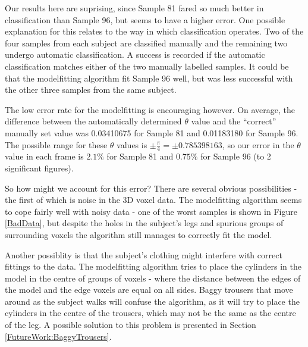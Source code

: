 Our results here are suprising, since Sample 81 fared so much better in classification than Sample 96, but seems to have a higher error.
One possible explanation for this relates to the way in which classification operates.
Two of the four samples from each subject are classified manually and the remaining two undergo automatic classification.
A success is recorded if the automatic classification matches either of the two manually labelled samples.
It could be that the modelfitting algorithm fit Sample 96 well, but was less successful with the other three samples from the same subject.

The low error rate for the modelfitting is encouraging however.
On average, the difference between the automatically determined $\theta$ value and the ``correct'' manually set value was 0.03410675 for Sample 81 and 0.01183180 for Sample 96.
The possible range for these $\theta$ values is $\pm \frac{\pi}{4} = \pm 0.785398163$, so our error in the $\theta$ value in each frame is $2.1\%$ for Sample 81 and $0.75\%$ for Sample 96 (to 2 significant figures).

\bigskip
\noindent So how might we account for this error?
There are several obvious possibilities - the first of which is noise in the 3D voxel data.
The modelfitting algorithm seems to cope fairly well with noisy data - one of the worst samples is shown in Figure \ref{BadData}, but despite the holes in the subject's legs and spurious groups of surrounding voxels the algorithm still manages to correctly fit the model.

Another possiblity is that the subject's clothing might interfere with correct fittings to the data.
The modelfitting algorithm tries to place the cylinders in the model in the centre of groups of voxels - where the distance between the edges of the model and the edge voxels are equal on all sides.
Baggy trousers that move around as the subject walks will confuse the algorithm, as it will try to place the cylinders in the centre of the trousers, which may not be the same as the centre of the leg.
A possible solution to this problem is presented in Section \ref{FutureWork:BaggyTrousers}.

